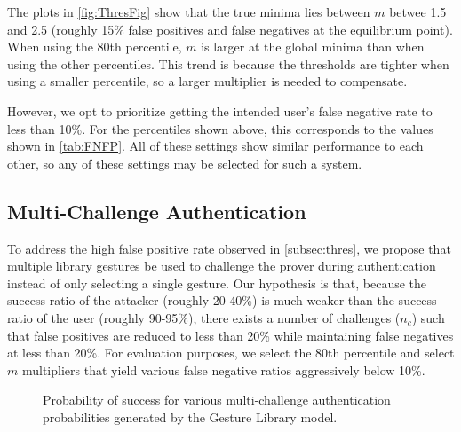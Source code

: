 The plots in \autoref{fig:ThresFig} show that the true minima lies between $m$ betwee 1.5 and 2.5 (roughly 15\% false positives and false negatives at the equilibrium point). When using the 80th percentile, $m$ is larger at the global minima than when using the other percentiles. This trend is because the thresholds are tighter when using a smaller percentile, so a larger multiplier is needed to compensate. 

However, we opt to prioritize getting the intended user's false negative rate to less than 10\%. For the percentiles shown above, this corresponds to the values shown in \autoref{tab:FNFP}. All of these settings show similar performance to each other, so any of these settings may be selected for such a system. 

%
%

\subsection{Multi-Challenge Authentication}

To address the high false positive rate observed in \autoref{subsec:thres}, we propose that multiple library gestures be used to challenge the prover during authentication instead of only selecting a single gesture. Our hypothesis is that, because the success ratio of the attacker (roughly 20-40\%) is much weaker than the success ratio of the user (roughly 90-95\%), there exists a number of challenges ($n_{c}$) such that false positives are reduced to less than 20\% while maintaining false negatives at less than 20\%. For evaluation purposes, we select the 80th percentile and select $m$ multipliers that yield various false negative ratios aggressively below 10\%. 

\begin{figure}[!t]
\centering
 \tikzdefaultformatgraph
   
   \caption{Probability of success for various multi-challenge authentication probabilities generated by the Gesture Library model.}
  \label{fig:multiauth}
\end{figure}

